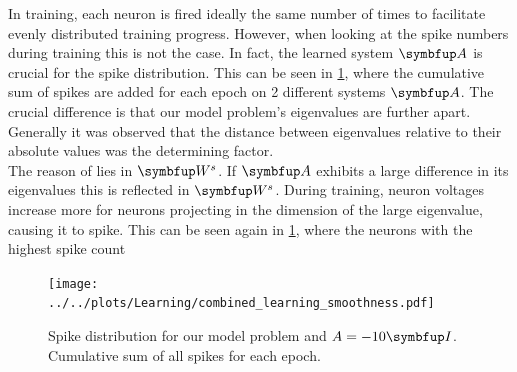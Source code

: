 In training, each neuron is fired ideally the same number of times to facilitate evenly distributed training progress. However, when looking at the spike numbers during training this is not the case. In fact, the learned system $\bmu{A}$ is crucial for the spike distribution. This can be seen in \cref{fig:spike_dist}, where the cumulative sum of spikes are added for each epoch on 2 different systems $\bmu{A}$. The crucial difference is that our model problem's eigenvalues are further apart. Generally it was observed that the distance between eigenvalues relative to their absolute values was the determining factor.\\
The reason of lies in $\bmu{W}^s$. If $\bmu{A}$ exhibits a large difference in its eigenvalues this is reflected in $\bmu{W}^s$. During training, neuron voltages increase more for neurons projecting in the dimension of the large eigenvalue, causing it to spike. This can be seen again in \cref{fig:spike_dist}, where the neurons with the highest spike count

\begin{figure}
	\centering
	\texttt{[image: ../../plots/Learning/combined\_learning\_smoothness.pdf]}
	\caption{Spike distribution for our model problem and $A = -10\bmu{I}$. Cumulative sum of all spikes for each epoch.}
	\label{fig:spike_dist}
\end{figure}


